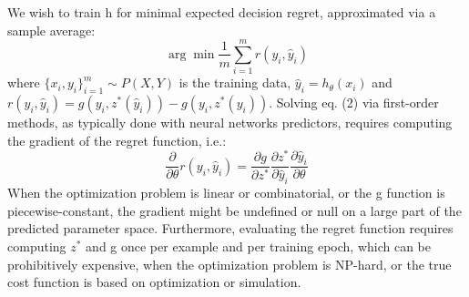 We wish to train h for minimal expected decision regret, approximated via a sample average: %
\begin{equation}
    \arg\min\frac{1}{m}\sum_{i=1}^{m}r(y_{i},\hat{y}_{i}) %
\end{equation}
where $\{x_{i},y_{i}\}_{i=1}^{m}\sim P(X,Y)$ is the training data, $\hat{y}_{i}=h_{\theta}(x_{i})$ and $r(y_{i},\hat{y}_{i})=g(y_{i},z^{*}(\hat{y}_{i}))-g(y_{i},z^{*}(y_{i}))$. %
Solving eq. (2) via first-order methods, as typically done with neural networks predictors, requires computing the gradient of the regret function, i.e.: %
\begin{equation}
    \frac{\partial}{\partial\theta}r(y_{i},\hat{y}_{i})=\frac{\partial g}{\partial z^{*}}\frac{\partial z^{*}}{\partial\hat{y}_{i}}\frac{\partial\hat{y}_{i}}{\partial\theta} %
\end{equation}
When the optimization problem is linear or combinatorial, or the g function is piecewise-constant, the gradient might be undefined or null on a large part of the predicted parameter space. %
Furthermore, evaluating the regret function requires computing $z^{*}$ and g once per example and per training epoch, which can be prohibitively expensive, when the optimization problem is NP-hard, or the true cost function is based on optimization or simulation. %
